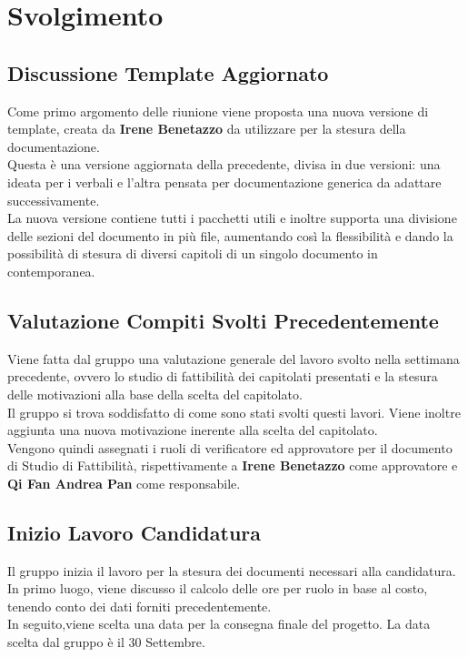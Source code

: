 \section{Svolgimento}
\subsection{Discussione Template Aggiornato}
 Come primo argomento delle riunione viene proposta una nuova versione di template, creata da \textbf{Irene Benetazzo} da utilizzare per la stesura della documentazione.
 \\ Questa è una versione aggiornata della precedente, divisa in due versioni: una ideata per i verbali e l'altra pensata per documentazione generica da adattare successivamente.
 \\La nuova versione contiene tutti i pacchetti utili e inoltre supporta una divisione delle sezioni del documento in più file, aumentando così la flessibilità e dando la possibilità di stesura di diversi capitoli di un singolo documento in contemporanea.
	
	
\subsection{Valutazione Compiti Svolti Precedentemente}
 Viene fatta dal gruppo una valutazione generale del lavoro svolto nella settimana precedente, ovvero lo studio di fattibilità dei capitolati presentati e la stesura delle motivazioni alla base della scelta del capitolato.
 \\ Il gruppo si trova soddisfatto di come sono stati svolti questi lavori. Viene inoltre aggiunta una nuova motivazione inerente alla scelta del capitolato.
 \\ Vengono quindi assegnati i ruoli di verificatore ed approvatore per il documento di Studio di Fattibilità, rispettivamente a \textbf{Irene Benetazzo} come approvatore e \textbf{Qi Fan Andrea Pan} come responsabile.


\subsection{Inizio Lavoro Candidatura}
 Il gruppo inizia il lavoro per la stesura dei documenti necessari alla candidatura. 
 \\In primo luogo, viene discusso il calcolo delle ore per ruolo in base al costo, tenendo conto dei dati forniti precedentemente.
 \\In seguito,viene scelta una data per la consegna finale del progetto. La data scelta dal gruppo è il 30 Settembre.


